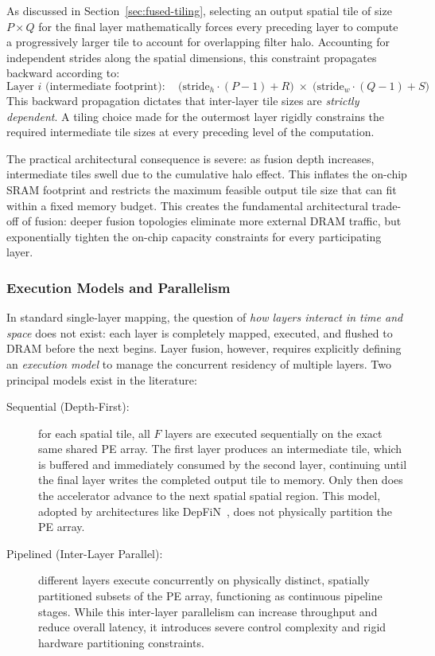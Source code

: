 As discussed in Section~\ref{sec:fused-tiling}, selecting an output spatial tile of size $P \times Q$ for the final layer mathematically forces every preceding layer to compute a progressively larger tile to account for overlapping filter halo. Accounting for independent strides along the spatial dimensions, this constraint propagates backward according to:
\begin{equation*}
\label{eq:cascading-tiles-recap}
\text{Layer } i \text{ (intermediate footprint)}: \quad
  \big(\text{stride}_h \cdot (P - 1) + R\big)
  \;\times\;
  \big(\text{stride}_w \cdot (Q - 1) + S\big)
\end{equation*}
This backward propagation dictates that inter-layer tile sizes are \emph{strictly dependent}. A tiling choice made for the outermost layer rigidly constrains the required intermediate tile sizes at every preceding level of the computation. 

The practical architectural consequence is severe: as fusion depth increases, intermediate tiles swell due to the cumulative halo effect. This inflates the on-chip SRAM footprint and restricts the maximum feasible output tile size that can fit within a fixed memory budget. This creates the fundamental architectural trade-off of fusion: deeper fusion topologies eliminate more external DRAM traffic, but exponentially tighten the on-chip capacity constraints for every participating layer.

\subsubsection{Execution Models and Parallelism}
\label{sec:fds-sequential}

In standard single-layer mapping, the question of \emph{how layers interact in time and space} does not exist: each layer is completely mapped, executed, and flushed to DRAM before the next begins. Layer fusion, however, requires explicitly defining an \emph{execution model} to manage the concurrent residency of multiple layers. 
Two principal models exist in the literature:

\begin{description}
  \item[Sequential (Depth-First):]
    for each spatial tile, all $F$ layers are executed sequentially on the exact same shared PE array. The first layer produces an intermediate tile, which is buffered and immediately consumed by the second layer, continuing until the final layer writes the completed output tile to memory. Only then does the accelerator advance to the next spatial spatial region. This model, adopted by architectures like DepFiN~\cite{goetschalckx2023depfin}, does not physically partition the PE array.    
  \item[Pipelined (Inter-Layer Parallel):]
    different layers execute concurrently on physically distinct, spatially partitioned subsets of the PE array, functioning as continuous pipeline stages. While this inter-layer parallelism can increase throughput and reduce overall latency, it introduces severe control complexity and rigid hardware partitioning constraints.
\end{description}

